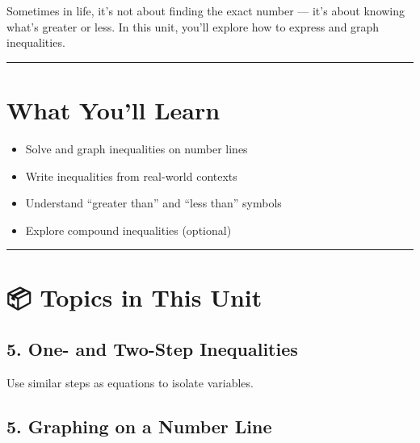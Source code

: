 \documentclass[
  letterpaper,
]{scrrept}
\providecommand{\tightlist}{%
  \setlength{\itemsep}{0pt}\setlength{\parskip}{0pt}}
\begin{document}
Sometimes in life, it's not about finding the exact number --- it's
about knowing what's greater or less. In this unit, you'll explore how
to express and graph inequalities.

\begin{center}\rule{0.5\linewidth}{0.5pt}\end{center}

\section*{What You'll Learn}\label{what-youll-learn-3}


\begin{itemize}
\tightlist
\item
  Solve and graph inequalities on number lines
\item
  Write inequalities from real-world contexts
\item
  Understand ``greater than'' and ``less than'' symbols
\item
  Explore compound inequalities (optional)
\end{itemize}

\begin{center}\rule{0.5\linewidth}{0.5pt}\end{center}

\section*{📦 Topics in This Unit}\label{topics-in-this-unit-3}


\subsection*{5. One- and Two-Step
Inequalities}\label{one--and-two-step-inequalities}

Use similar steps as equations to isolate variables.

\subsection*{5. Graphing on a Number
Line}\label{graphing-on-a-number-line}
\end{document}
